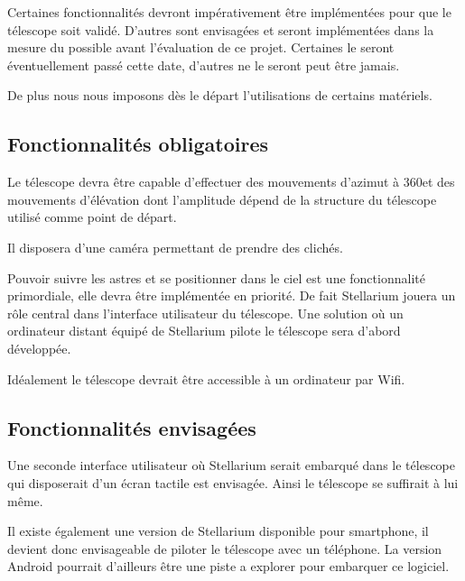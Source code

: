 Certaines fonctionnalités devront impérativement être implémentées pour que le télescope soit validé. D'autres sont envisagées et seront implémentées dans la mesure du possible avant l'évaluation de ce projet. Certaines le seront éventuellement passé cette date, d'autres ne le seront peut être jamais.

De plus nous nous imposons dès le départ l'utilisations de certains matériels.

\subsection{Fonctionnalités obligatoires}

Le télescope devra être capable d'effectuer des mouvements d'azimut à 360\textdegree et des mouvements d'élévation dont l'amplitude dépend de la structure du télescope utilisé comme point de départ.

\vspace{1cm}

Il disposera d'une caméra permettant de prendre des clichés.

\vspace{1cm}

Pouvoir suivre les astres et se positionner dans le ciel est une fonctionnalité primordiale, elle devra être implémentée en priorité. De fait Stellarium jouera un rôle central dans l'interface utilisateur du télescope. Une solution où un ordinateur distant équipé de Stellarium pilote le télescope sera d'abord développée.

\vspace{1cm}

Idéalement le télescope devrait être accessible à un ordinateur par Wifi.


\subsection{Fonctionnalités envisagées}

Une seconde interface utilisateur où Stellarium serait embarqué dans le télescope qui disposerait d'un écran tactile est envisagée. Ainsi le télescope se suffirait à lui même.

Il existe également une version de Stellarium disponible pour smartphone, il devient donc envisageable de piloter le télescope avec un téléphone. La version Android pourrait d'ailleurs être une piste a explorer pour embarquer ce logiciel.
 

